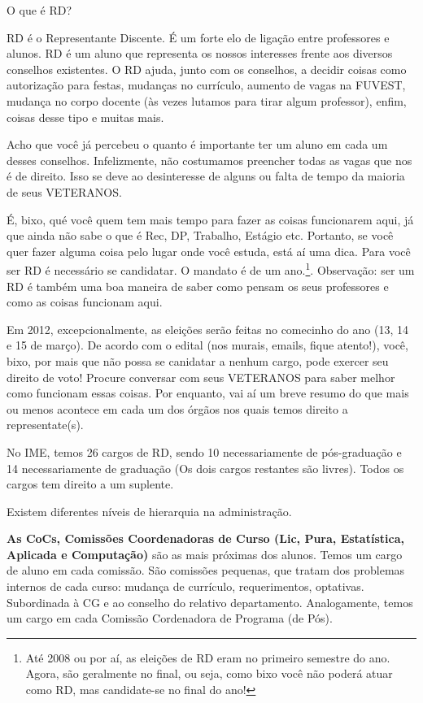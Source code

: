 \begin{secao}{O que é RD?}

RD é o Representante Discente. É um forte elo de ligação entre professores e alunos. 
RD é um aluno que representa os nossos interesses frente aos diversos conselhos existentes.
O RD ajuda, junto com os conselhos, a decidir coisas como autorização para festas, 
mudanças no currículo, aumento de vagas na FUVEST, mudança no corpo docente (às 
vezes lutamos para tirar algum professor), enfim, coisas desse tipo e muitas mais. 

Acho que você já percebeu o quanto é importante ter um aluno em cada um desses conselhos. 
Infelizmente, não costumamos preencher todas as vagas que nos é de direito. Isso se 
deve ao desinteresse de alguns ou  falta de tempo da maioria de seus VETERANOS. 

É, bixo, qué você quem tem mais tempo para fazer as coisas funcionarem aqui, já que 
ainda não sabe o que é Rec, DP, Trabalho, Estágio etc. Portanto, se você quer fazer 
alguma coisa pelo lugar onde você estuda, está aí uma dica. Para você ser RD é 
necessário se candidatar. O mandato é de um ano.\footnote{Até 2008 ou por aí, as eleições de RD eram no primeiro semestre do ano. Agora, são geralmente no final, ou seja, como bixo você não poderá atuar como RD, mas candidate-se no final do ano!}. Observação: ser um RD é também uma boa maneira de saber como pensam os seus professores e como as coisas funcionam aqui.

Em 2012, excepcionalmente, as eleições serão feitas no comecinho do ano (13, 14 e 15 de março). De acordo com o edital (nos murais, emails, fique atento!), você, bixo, por mais que não possa se canidatar a nenhum cargo, pode exercer seu direito de voto! Procure conversar com seus VETERANOS para saber melhor como funcionam essas coisas. Por enquanto, vai aí um breve resumo do que mais ou menos acontece em cada um dos órgãos nos quais temos direito a representate(s).
  
No IME, temos 26 cargos de RD, sendo 10 necessariamente de
pós-graduação e 14 necessariamente de graduação (Os dois cargos
restantes são livres). Todos os cargos tem direito a um suplente.
 
Existem diferentes níveis de hierarquia na administração.
 
{\bf As CoCs,
Comissões Coordenadoras de Curso (Lic, Pura, Estatística, Aplicada e
Computação)} são as mais próximas dos alunos. Temos um cargo de aluno em cada comissão. São comissões
pequenas, que tratam
dos problemas internos de cada curso: mudança de currículo,
requerimentos, optativas. Subordinada à CG e ao conselho do relativo
departamento. Analogamente, temos um cargo em cada Comissão
Cordenadora de Programa (de Pós).
 

\end{secao}

